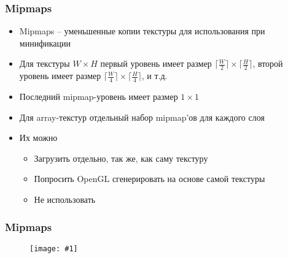 \documentclass{beamer}
\newcommand{\slideimage}[1]{
  \begin{figure}
    \begin{adjustbox}{width=\textwidth, totalheight=\textheight-2\baselineskip-2\baselineskip,keepaspectratio}
      \texttt{[image: \#1]}
    \end{adjustbox}
  \end{figure}
}
\begin{document}
\begin{frame}[fragile]
\frametitle{Mipmaps}
\begin{itemize}
\item Mipmaps -- уменьшенные копии текстуры для использования при минификации
\pause
\item Для текстуры \begin{math}W\times H\end{math} первый уровень имеет размер \begin{math}\lceil\frac{W}{2}\rceil\times \lceil\frac{H}{2}\rceil\end{math}, второй уровень имеет размер \begin{math}\lceil\frac{W}{4}\rceil\times \lceil\frac{H}{4}\rceil\end{math}, и т.д.
\item Последний mipmap-уровень имеет размер \begin{math}1\times 1\end{math}
\item Для array-текстур отдельный набор mipmap'ов для каждого слоя
\pause
\item Их можно
\begin{itemize}
\item Загрузить отдельно, так же, как саму текстуру
\item Попросить OpenGL сгенерировать на основе самой текстуры
\item Не использовать
\end{itemize}
\end{itemize}
\end{frame}

\begin{frame}
\frametitle{Mipmaps}
\slideimage{mipmaps.png}
\end{frame}
\end{document}

